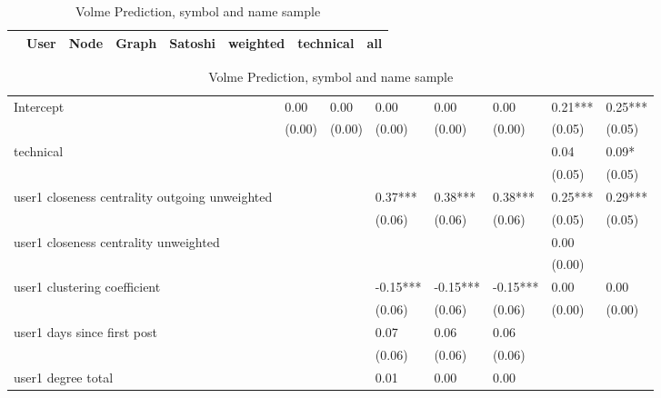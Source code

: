 \begin{table}
\caption{Volme Prediction, symbol and name sample}
\begin{center}
\begin{tabular}{lccccccc}
\hline
                                               &   User  &   Node  &  Graph   & Satoshi  & weighted & technical &   all    \\
\hline
\hline
\end{tabular}
\begin{tabular}{llllllll}
Intercept                                      & 0.00    & 0.00    & 0.00     & 0.00     & 0.00     & 0.21***   & 0.25***  \\
                                               & (0.00)  & (0.00)  & (0.00)   & (0.00)   & (0.00)   & (0.05)    & (0.05)   \\
technical                                      &         &         &          &          &          & 0.04      & 0.09*    \\
                                               &         &         &          &          &          & (0.05)    & (0.05)   \\
user1 closeness centrality outgoing unweighted &         &         & 0.37***  & 0.38***  & 0.38***  & 0.25***   & 0.29***  \\
                                               &         &         & (0.06)   & (0.06)   & (0.06)   & (0.05)    & (0.05)   \\
user1 closeness centrality unweighted          &         &         &          &          &          & 0.00      &          \\
                                               &         &         &          &          &          & (0.00)    &          \\
user1 clustering coefficient                   &         &         & -0.15*** & -0.15*** & -0.15*** & 0.00      & 0.00     \\
                                               &         &         & (0.06)   & (0.06)   & (0.06)   & (0.00)    & (0.00)   \\
user1 days since first post                    &         &         & 0.07     & 0.06     & 0.06     &           &          \\
                                               &         &         & (0.06)   & (0.06)   & (0.06)   &           &          \\
user1 degree total                             &         &         & 0.01     & 0.00     & 0.00     &           &          \\

\end{tabular}
\end{center}
\end{table}
